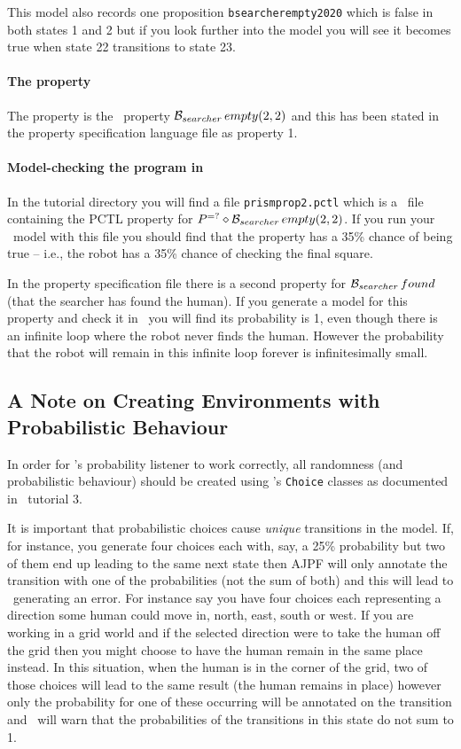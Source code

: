 \documentclass[a4]{article}
\begin{document}
This model also records one proposition \texttt{bsearcherempty2020} which is false in both states 1 and 2 but if you look further into the model you will see it becomes true when state 22 transitions to state 23.

\paragraph{The property} The property is the \ajpf\ property $\mathrm{{\cal B}}_{searcher} \, empty(2, 2)$ and this has been stated in the property specification language file as property 1. 

\paragraph{Model-checking the program in \prism}  In the tutorial directory you will find a file \texttt{prismprop2.pctl} which is a \prism\ file containing the PCTL property for $P^{=?}\diamond \mathrm{{\cal B}}_{searcher} \, empty(2, 2)$.  If you run your \prism\ model with this file you should find that the property has a 35\% chance of being true -- i.e., the robot has a 35\% chance of checking the final square.

In the property specification file there is a second property for $\mathrm{{\cal B}}_{searcher} \, found$ (that the searcher has found the human).  If you generate a model for this property and check it in \prism\ you will find its probability is 1, even though there is an infinite loop where the robot never finds the human.   However the probability that the robot will remain in this infinite loop forever is infinitesimally small.

\subsection{A Note on Creating Environments with Probabilistic Behaviour}

In order for \ajpf's probability listener to work correctly, all randomness (and probabilistic behaviour) should be created using \ail's \texttt{Choice} classes as documented in \ail\ tutorial 3.  

It is important that probabilistic choices cause \emph{unique} transitions in the model.  If, for instance, you generate four choices each with, say, a 25\% probability but two of them end up leading to the same next state then AJPF will only annotate the transition with one of the probabilities (not the sum of both) and this will lead to \prism\ generating an error.  For instance say you have four choices each representing a direction some human could move in, north, east, south or west.  If you are working in a grid world and if the selected direction were to take the human off the grid then you might choose to have the human remain in the same place instead.  In this situation, when the human is in the corner of the grid, two of those choices will lead to the same result (the human remains in place) however only the probability for one of these occurring will be annotated on the transition and \prism\ will warn that the probabilities of the transitions in this state do not sum to 1.
\end{document}

